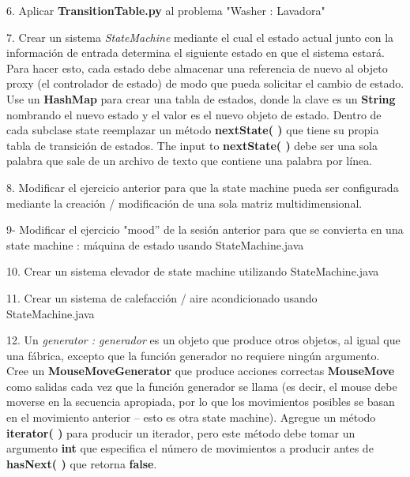 6. Aplicar \textbf{TransitionTable.py} al problema "Washer : Lavadora"  \newline

7. Crear un sistema \textit{StateMachine} mediante el cual el estado actual junto con la información de entrada determina el siguiente estado en que el sistema estará. Para hacer esto, cada estado debe almacenar una referencia de nuevo al objeto proxy (el controlador de estado) de modo que pueda solicitar el cambio de estado. Use un \textbf{HashMap} para crear una tabla de estados, donde la clave es un \textbf{String} nombrando el nuevo estado y el valor es el nuevo objeto de estado. Dentro de cada subclase state reemplazar un método \textbf{nextState( )} que tiene su propia tabla de transición de estados. The input to \textbf{nextState( )} debe ser una sola palabra que sale de un archivo de texto que contiene una palabra por línea.  \newline

8. Modificar el ejercicio anterior para que la state machine pueda ser configurada mediante la creación / modificación de una sola matriz multidimensional. \newline

9- Modificar el ejercicio  "mood” de la sesión anterior para que se convierta en una  state machine : máquina de estado usando StateMachine.java     \newline

10. Crear un sistema elevador de state machine utilizando StateMachine.java     \newline

11. Crear un sistema de calefacción / aire acondicionado usando StateMachine.java   \newline

12. Un \textit{generator : generador} es un objeto que produce otros objetos, al igual que una fábrica, excepto que la función generador no requiere ningún argumento. Cree un \textbf{MouseMoveGenerator} que produce acciones correctas \textbf{MouseMove} como salidas cada vez que la función generador se llama (es decir, el mouse debe moverse en la secuencia apropiada, por lo que los movimientos posibles se basan en el movimiento anterior – esto es otra state machine). Agregue un método \textbf{iterator( )} para producir un iterador, pero este método debe tomar un argumento  \textbf{int} que especifica el número de movimientos a producir antes de \textbf{hasNext( )} que retorna \textbf{false}.
